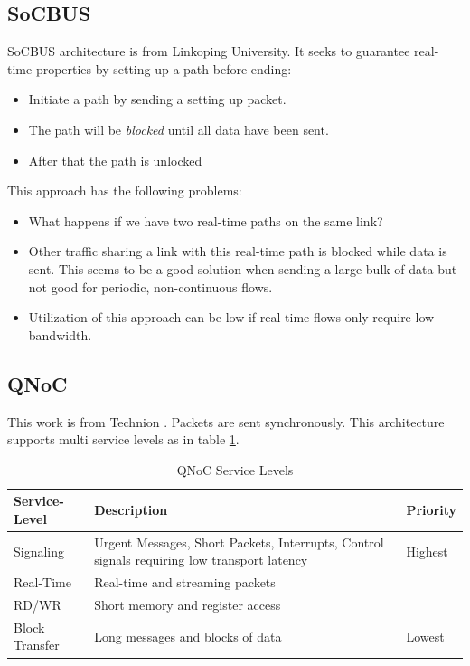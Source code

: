 \documentclass[conference, twocolumn]{IEEEtran}
\theoremstyle{definition}
\begin{document}
\subsection{SoCBUS}
SoCBUS architecture \cite{SoCBUS} is from Linkoping University. It seeks to 
guarantee real-time properties by setting up a path before ending:
\begin{itemize}
\item Initiate a path by sending a setting up packet.
\item The path will be {\em blocked} until all data have been sent.
\item After that the path is unlocked
\end{itemize}
This approach has the following problems: 
\begin{itemize}
\item What happens if we have two real-time paths on the same link?
\item Other traffic sharing a link with this real-time path is blocked while 
data is sent. This seems to be a good solution when sending a large bulk of data 
but not good for periodic, non-continuous flows.
\item Utilization of this approach can be low if real-time flows only require
low bandwidth.
\end{itemize}
\subsection{QNoC}
This work is from Technion \cite{QNoC}. Packets are sent synchronously. 
This architecture supports multi service levels as in table \ref{table:QNoCTable}.

\begin{table}[htbp]
\begin{center}
  \begin{tabular}{ | p{2.3cm} | p{4cm} | p{1.2cm} |}
    \hline
	Service-Level & Description & Priority \\ \hline
	Signaling & Urgent Messages, Short Packets, Interrupts, Control signals 
	requiring low transport latency & Highest \\ \hline
	Real-Time & Real-time and streaming packets & \\ \hline
	RD/WR & Short memory and register access & \\ \hline
	Block Transfer & Long messages and blocks of data & Lowest \\
    \hline
  \end{tabular}
\end{center}
\caption{QNoC Service Levels}
\label{table:QNoCTable}
\end{table}
\end{document}
